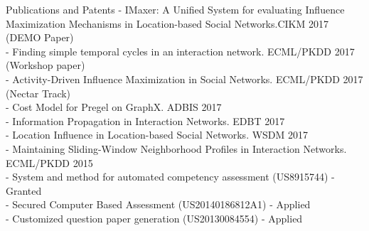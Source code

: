 \documentclass{resume} %
\begin{document}
\begin{rSection}{Publications and Patents}
- IMaxer: A Unified System for evaluating Influence Maximization Mechanisms in Location-based Social Networks.CIKM 2017 (DEMO Paper)\\
- Finding simple temporal cycles in an interaction network. ECML/PKDD 2017 (Workshop paper)\\
- Activity-Driven Influence Maximization in Social Networks. ECML/PKDD 2017 (Nectar Track)\\
- Cost Model for Pregel on GraphX. ADBIS 2017\\
- Information Propagation in Interaction Networks. EDBT 2017\\
- Location Influence in Location-based Social Networks. WSDM 2017\\
- Maintaining Sliding-Window Neighborhood Profiles in Interaction Networks. ECML/PKDD 2015\\
- System and method for automated competency assessment (US8915744) - Granted\\ %
- Secured Computer Based Assessment (US20140186812A1) - Applied\\ %
- Customized question paper generation (US20130084554) - Applied %
\end{rSection}
\iffalse





\fi

\break

%
\end{document}
